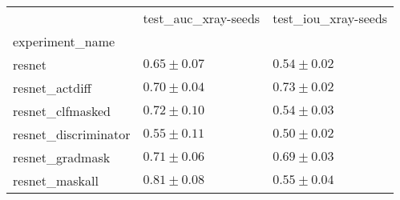 \begin{tabular}{lll}
\toprule
{} & test_auc_xray-seeds & test_iou_xray-seeds \\
experiment_name      &                     &                     \\
\midrule
resnet               &       $0.65\pm0.07$ &       $0.54\pm0.02$ \\
resnet_actdiff       &       $0.70\pm0.04$ &       $0.73\pm0.02$ \\
resnet_clfmasked     &       $0.72\pm0.10$ &       $0.54\pm0.03$ \\
resnet_discriminator &       $0.55\pm0.11$ &       $0.50\pm0.02$ \\
resnet_gradmask      &       $0.71\pm0.06$ &       $0.69\pm0.03$ \\
resnet_maskall       &       $0.81\pm0.08$ &       $0.55\pm0.04$ \\
\bottomrule
\end{tabular}
